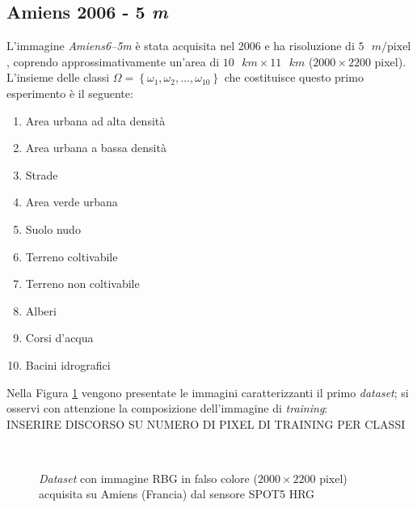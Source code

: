 \subsection{Amiens 2006 - 5 \textit{m}}
L'immagine \emph{Amiens6--5m} è stata acquisita nel 2006 e ha risoluzione di $5\text{ }m/\text{pixel}$, coprendo approssimativamente un'area di $10\text{ }km\times11\text{ }km$ ($2000\times2200$ pixel).\\
L'insieme delle classi $\Omega=\left\lbrace\omega_1,\omega_2,\ldots,\omega_{10}\right\rbrace$ che costituisce questo primo esperimento è il seguente:
\begin{enumerate}
\item Area urbana ad alta densità
\item Area urbana a bassa densità
\item Strade
\item Area verde urbana 
\item Suolo nudo
\item Terreno coltivabile
\item Terreno non coltivabile 
\item Alberi
\item Corsi d'acqua
\item Bacini idrografici
\end{enumerate}
Nella Figura \ref{fig: Amiens65m} vengono presentate le immagini caratterizzanti il primo \emph{dataset}; si osservi con attenzione la composizione dell'immagine di \emph{training}: 
\\INSERIRE DISCORSO SU NUMERO DI PIXEL DI TRAINING PER CLASSI

\clearpage
\begin{figure}[!ht]
   \center
   \\%
     \hspace{4mm}
    \caption{\emph{Dataset} con immagine RBG in falso colore ($2000\times2200$ pixel) acquisita su Amiens (Francia) dal sensore \textsc{SPOT5 HRG}}
    \label{fig: Amiens65m}
  \end{figure}
  
\clearpage
